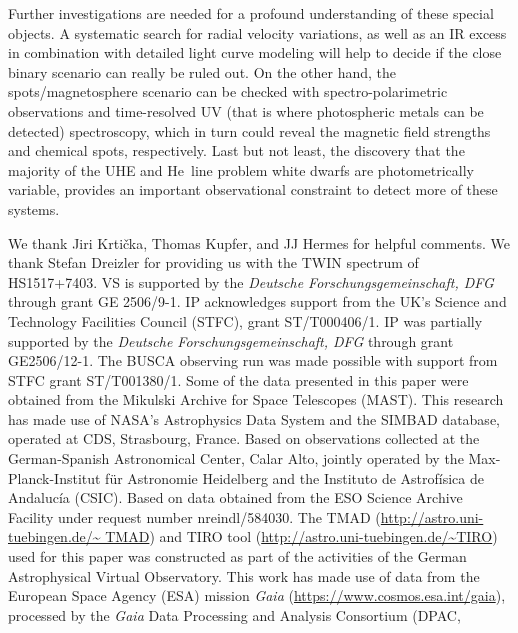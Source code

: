 \documentclass{aa}
\newcounter{Rco}
\newcommand{\Ionst}[1]{\setcounter{Rco}{#1}\Roman{Rco}}
\newcommand{\Ion}[2]{\mbox{#1\,{\scriptsize\Ionst{#2}}}}
\begin{document}
Further investigations are needed for a profound understanding of
these special objects. A systematic search for radial velocity variations,
as well as an IR excess in combination with detailed light curve modeling
will help to decide if the close binary scenario can really be ruled out.
On the other hand, the spots/magnetosphere scenario can be checked with
spectro-polarimetric observations and time-resolved UV (that is where
photospheric metals can be detected) spectroscopy, which in turn
could reveal the magnetic field strengths and chemical spots, respectively.
Last but not least, the discovery that the majority of the UHE and
\Ion{He}{2} line problem white dwarfs are photometrically variable, provides
an important observational constraint to detect more of these systems.
 
 
\begin{acknowledgements}
  We thank Jiri Krti\v{c}ka, Thomas Kupfer, and JJ Hermes for
  helpful comments. We thank Stefan Dreizler
      for providing us with the TWIN spectrum of HS1517+7403.
      VS is supported by the \emph{Deut\-sche
      For\-schungs\-ge\-mein\-schaft, DFG\/} through grant GE 2506/9-1.
      IP acknowledges support from the UK's Science and Technology
      Facilities Council (STFC), grant ST/T000406/1.
      IP was partially supported by the \emph{Deut\-sche
      For\-schungs\-ge\-mein\-schaft, DFG\/} through grant GE2506/12-1.
      The BUSCA observing run was made possible with support from STFC grant ST/T001380/1.
      Some of the data presented in this paper were obtained
      from the Mikulski Archive for Space Telescopes (MAST). This research
      has made use of NASA's Astrophysics Data System and the SIMBAD
      database, operated at CDS, Strasbourg, France.
      Based on observations collected at the German-Spanish Astronomical
      Center, Calar Alto, jointly operated by the Max-Planck-Institut
      f\"ur Astronomie Heidelberg and the Instituto de Astrof\'{i}sica de
      Andaluc\'{i}a (CSIC).
      Based on data obtained from the ESO Science Archive Facility
      under request number nreindl/584030.
      The TMAD (\url{http://astro.uni-tuebingen.de/~ TMAD})
      and TIRO tool (\url{http://astro.uni-tuebingen.de/~TIRO}) used for
      this paper was constructed as part of the activities of the German
      Astrophysical Virtual Observatory.
      This work has made use of data from the European Space Agency (ESA) mission
      {\it Gaia} (\url{https://www.cosmos.esa.int/gaia}), processed by the {\it Gaia}
      Data Processing and Analysis Consortium (DPAC,

\end{acknowledgements}
\end{document}
